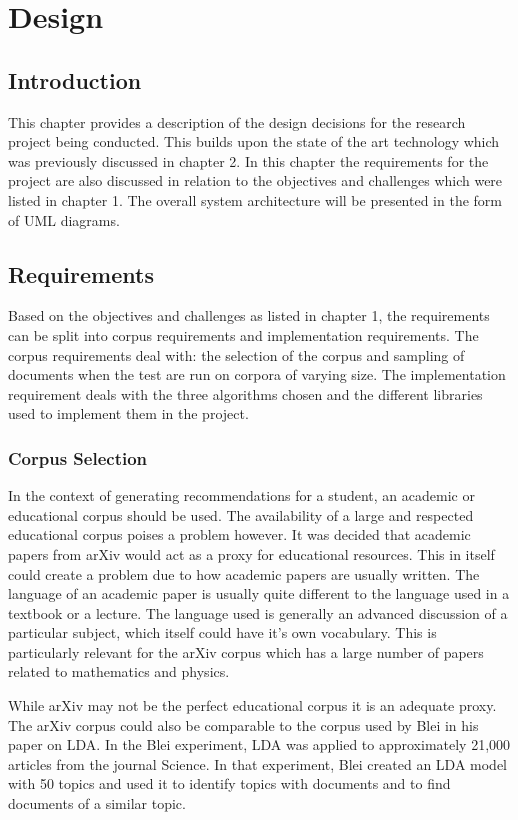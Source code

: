 \chapter{Design}

\section{Introduction}
This chapter provides a description of the design decisions for the research project being conducted.
This builds upon the state of the art technology which was previously discussed in chapter 2.
In this chapter the requirements for the project are also discussed in relation to the objectives and challenges which were listed in chapter 1.
The overall system architecture will be presented in the form of UML diagrams.

\section{Requirements}
Based on the objectives and challenges as listed in chapter 1, the requirements can be split into corpus requirements and implementation requirements.
The corpus requirements deal with: the selection of the corpus and sampling of documents when the test are run on corpora of varying size.
The implementation requirement deals with the three algorithms chosen and the different libraries used to implement them in the project.

\subsection{Corpus Selection}
In the context of generating recommendations for a student, an academic or educational corpus should be used.
The availability of a large and respected educational corpus poises a problem however.
It was decided that academic papers from arXiv would act as a proxy for educational resources.
This in itself could create a problem due to how academic papers are usually written.
The language of an academic paper is usually quite different to the language used in a textbook or a lecture.
The language used is generally an advanced discussion of a particular subject, which itself could have it's own vocabulary.
This is particularly relevant for the arXiv corpus which has a large number of papers related to mathematics and physics.

While arXiv may not be the perfect educational corpus it is an adequate proxy.
The arXiv corpus could also be comparable to the corpus used by Blei in his paper on LDA.\cite{blei2009topic}
In the Blei experiment, LDA was applied to approximately 21,000 articles from the journal Science.
In that experiment, Blei created an LDA model with 50 topics and used it to identify topics with documents and to find documents of a similar topic.

